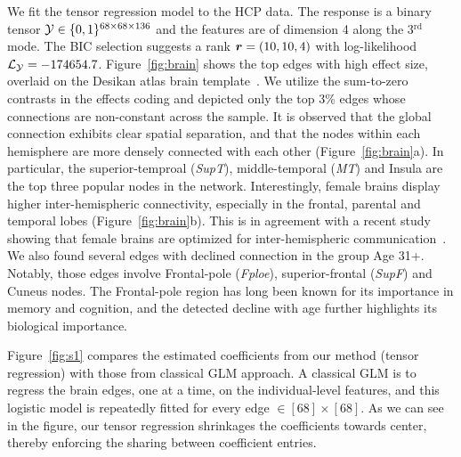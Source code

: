 \documentclass[12pt]{article}
\theoremstyle{plain}
\theoremstyle{definition}
\begin{document}
We fit the tensor regression model to the HCP data. The response is a binary tensor $\mathcal{Y}\in\{0,1\}^{68\times 68\times 136}$ and the features are of dimension 4 along the 3$^{\text{rd}}$ mode. The BIC selection suggests a rank $\bm{r}=(10,10,4)$ with log-likelihood $\mathcal{L}_{\mathcal{Y}}=-174654.7$. Figure~\ref{fig:brain} shows the top edges with high effect size, overlaid on the Desikan atlas brain template~\citep{desikan2006automated,xia2013brainnet}. We utilize the sum-to-zero contrasts in the effects coding and depicted only the top 3\% edges whose connections are non-constant across the sample. It is observed that the global connection exhibits clear spatial separation, and that the nodes within each hemisphere are more densely connected with each other (Figure~\ref{fig:brain}a). In particular, the superior-temproal (\emph{SupT}), middle-temporal (\emph{MT}) and Insula are the top three popular nodes in the network. Interestingly, female brains display higher inter-hemispheric connectivity, especially in the frontal, parental and temporal lobes (Figure~\ref{fig:brain}b). This is in agreement with a recent study showing that female brains are optimized for inter-hemispheric communication~\citep{ingalhalikar2014sex}. We also found several edges with declined connection in the group Age 31+. Notably, those edges involve Frontal-pole (\emph{Fploe}), superior-frontal (\emph{SupF}) and Cuneus nodes. The Frontal-pole region has long been known for its importance in memory and cognition, and the detected decline with age further highlights its biological importance. 

Figure~\ref{fig:s1} compares the estimated coefficients from our method (tensor regression) with those from classical GLM approach. A classical GLM is to regress the brain edges, one at a time, on the individual-level features, and this logistic model is repeatedly fitted for every edge $\in [68]\times [68]$. As we can see in the figure, our tensor regression shrinkages the coefficients towards center, thereby enforcing the sharing between coefficient entries. 
\end{document}

